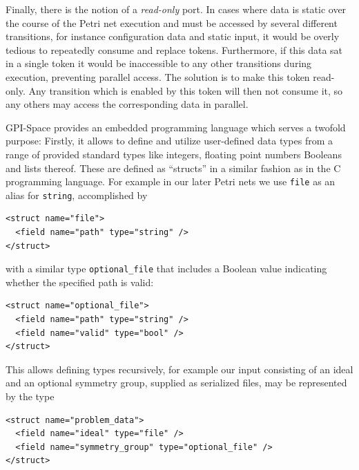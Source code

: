 \documentclass[
  paper=a4,
  titlepage,
  bibliography=totoc,
  pagesize=pdftex
]{scrartcl}
\numberwithin{figure}{section}
\numberwithin{equation}{section}
\numberwithin{table}{section}
\theoremstyle{definition}
\numberwithin{definition}{section}
\begin{document}
\begin{description}[leftmargin=\parindent]
    Finally, there is the notion of a \emph{read-only} port. In cases where data is static
    over the course of the Petri net execution and must be accessed by several different
    transitions, for instance configuration data and static input, it would be overly
    tedious to repeatedly consume and replace tokens. Furthermore, if this data sat in a
    single token it would be inaccessible to any other transitions during execution,
    preventing parallel access. The solution is to make this token read-only. Any
    transition which is enabled by this token will then not consume it, so any others may
    access the corresponding data in parallel.
  \item[Expression Language:] GPI-Space provides an embedded programming language which
    serves a twofold purpose: Firstly, it allows to define and utilize user-defined data
    types from a range of provided standard types like integers, floating point numbers
    Booleans and lists thereof. These are defined as \enquote{structs} in a similar
    fashion as in the C programming language. For example in our later Petri nets we use
    \texttt{file} as an alias for \texttt{string}, accomplished by
    \begin{verbatim}
<struct name="file">
  <field name="path" type="string" />
</struct>\end{verbatim}%
    with a similar type \texttt{optional\_file} that includes a Boolean value indicating
    whether the specified path is valid:
    \begin{verbatim}
<struct name="optional_file">
  <field name="path" type="string" />
  <field name="valid" type="bool" />
</struct>\end{verbatim}%
    This allows defining types recursively, for example our input consisting of an ideal
    and an optional symmetry group, supplied as serialized files, may be represented by
    the type
    \begin{verbatim}
<struct name="problem_data">
  <field name="ideal" type="file" />
  <field name="symmetry_group" type="optional_file" />
</struct>\end{verbatim}%


\end{description}
\end{document}
